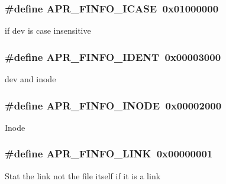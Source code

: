 \subsubsection[{\texorpdfstring{A\+P\+R\+\_\+\+F\+I\+N\+F\+O\+\_\+\+I\+C\+A\+SE}{APR_FINFO_ICASE}}]{\setlength{\rightskip}{0pt plus 5cm}\#define A\+P\+R\+\_\+\+F\+I\+N\+F\+O\+\_\+\+I\+C\+A\+SE~0x01000000}\hypertarget{group__apr__file__stat_gac46eeba0ae0e771c6ed3cb27fd5492d8}{}\label{group__apr__file__stat_gac46eeba0ae0e771c6ed3cb27fd5492d8}
if dev is case insensitive 
\subsubsection[{\texorpdfstring{A\+P\+R\+\_\+\+F\+I\+N\+F\+O\+\_\+\+I\+D\+E\+NT}{APR_FINFO_IDENT}}]{\setlength{\rightskip}{0pt plus 5cm}\#define A\+P\+R\+\_\+\+F\+I\+N\+F\+O\+\_\+\+I\+D\+E\+NT~0x00003000}\hypertarget{group__apr__file__stat_ga3ac8c8d0492291417be3d32556464108}{}\label{group__apr__file__stat_ga3ac8c8d0492291417be3d32556464108}
dev and inode 
\subsubsection[{\texorpdfstring{A\+P\+R\+\_\+\+F\+I\+N\+F\+O\+\_\+\+I\+N\+O\+DE}{APR_FINFO_INODE}}]{\setlength{\rightskip}{0pt plus 5cm}\#define A\+P\+R\+\_\+\+F\+I\+N\+F\+O\+\_\+\+I\+N\+O\+DE~0x00002000}\hypertarget{group__apr__file__stat_ga4fee7341395912db501b40de81dbba26}{}\label{group__apr__file__stat_ga4fee7341395912db501b40de81dbba26}
Inode 
\subsubsection[{\texorpdfstring{A\+P\+R\+\_\+\+F\+I\+N\+F\+O\+\_\+\+L\+I\+NK}{APR_FINFO_LINK}}]{\setlength{\rightskip}{0pt plus 5cm}\#define A\+P\+R\+\_\+\+F\+I\+N\+F\+O\+\_\+\+L\+I\+NK~0x00000001}\hypertarget{group__apr__file__stat_ga9b0c1d02401b845f928f836fdd3c6712}{}\label{group__apr__file__stat_ga9b0c1d02401b845f928f836fdd3c6712}
Stat the link not the file itself if it is a link 
